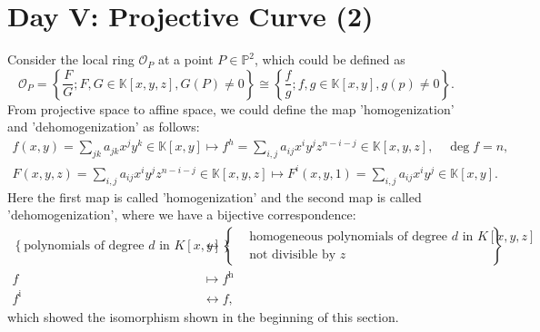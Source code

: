\documentclass[10pt]{article}
\begin{document}
\section{Day V: Projective Curve (2)}

Consider the local ring $ \mathcal{O}_{P}$ at a point $ P \in \mathbb{P}^{2}$, which could be defined as
\begin{equation*}
  \mathcal{O}_{P} = \left\{ \frac{F}{G} ; F, G \in \mathbb{K}[x,y,z] , G(P) \neq 0 \right\} \cong \left\{ \frac{f}{g}; f, g \in \mathbb{K}[x,y] , g(p) \neq 0 \right\}.
\end{equation*}
From projective space to affine space, we could define the map 'homogenization' and 'dehomogenization' as follows:
\begin{equation*}
  \begin{aligned}
    f(x,y) = \sum_{jk} a_{jk} x^{j} y^{k} \in \mathbb{K}[x,y] \mapsto f^{h} = \sum_{i,j} a_{ij} x^{i} y^{j} z^{n-i-j} \in \mathbb{K}[x,y,z], \quad \deg f = n, \\
    F(x,y,z) = \sum_{i,j} a_{ij} x^{i} y^{j} z^{n-i-j} \in \mathbb{K}[x,y,z] \mapsto F^{i}(x,y,1) = \sum_{i,j} a_{ij} x^{i} y^{j} \in \mathbb{K}[x,y].
  \end{aligned}
\end{equation*}
Here the first map is called 'homogenization' and the second map is called 'dehomogenization', where we have a bijective correspondence:
\begin{equation*}
  \begin{aligned}
    \left\{\text{polynomials of degree }d\text{ in }K[x,y]\right\}
    &\longleftrightarrow
    \left\{
      \begin{aligned}
        &\text{homogeneous polynomials of degree }d\text{ in }K[x,y,z]\\
        &\text{not divisible by }z
    \end{aligned}\right\}\\
    f &\longmapsto f^\mathrm{h}\\
    f^\mathrm{i} &\longleftrightarrow f,
  \end{aligned}
\end{equation*}
which showed the isomorphism shown in the beginning of this section.
\end{document}
